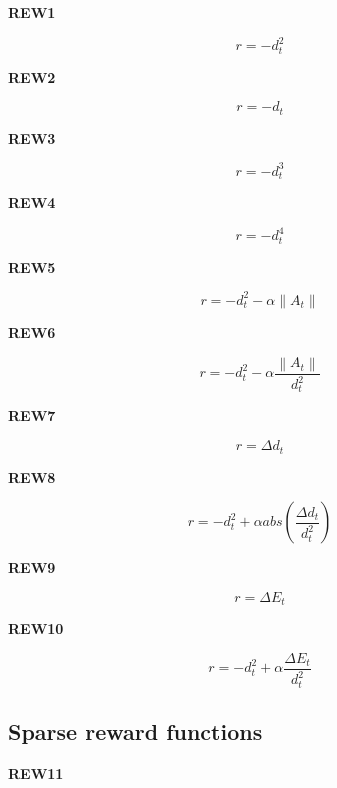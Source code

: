\documentclass{article}
\newcommand{\norm}[1]{\left\lVert#1\right\rVert}
\begin{document}
\textbf{REW1} 

\begin{equation}
r = - d_t^2
\end{equation}

\textbf{REW2} 

\begin{equation}
r = - d_t
\end{equation}

\textbf{REW3} 

\begin{equation}
r = - d_t^3
\end{equation}

\textbf{REW4} 

\begin{equation}
r = - d_t^4
\end{equation}

\textbf{REW5} 

\begin{equation}
r = - d_t^2 - \alpha \norm{A_t}
\end{equation}

\textbf{REW6} 

\begin{equation}
r = - d_t^2 - \alpha \frac{\norm{A_t}}{d_t^2}
\end{equation}

\textbf{REW7} 

\begin{equation}
r = \Delta d_t
\end{equation}

\textbf{REW8} 

\begin{equation}
r = - d_t^2 + \alpha abs( \frac{\Delta d_t}{d_t^2})
\end{equation}

\textbf{REW9} 

\begin{equation}
r = \Delta E_t
\end{equation}

\textbf{REW10} 

\begin{equation}
r = - d_t^2 + \alpha \frac{\Delta E_t}{d_t^2}
\end{equation}


\subsection{Sparse reward functions}

\textbf{REW11} 
\end{document}
